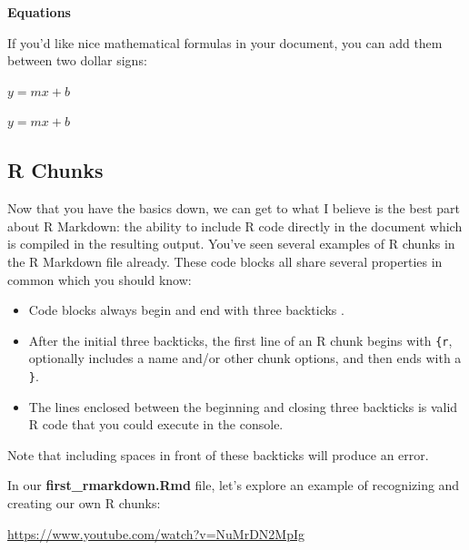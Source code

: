 \documentclass[]{tufte-book}
\newenvironment{Shaded}{\begin{snugshade}}{\end{snugshade}}
\newcommand{\NormalTok}[1]{#1}
\providecommand{\tightlist}{%
  \setlength{\itemsep}{0pt}\setlength{\parskip}{0pt}}
\begin{document}
\vspace*{0.2in}

\noindent\textbf{Equations}\vspace*{0.1in}

If you'd like nice mathematical formulas in your document, you can add them between two dollar signs:

\begin{Shaded}
\begin{Highlighting}[]
\NormalTok{$y = mx + b$}
\end{Highlighting}
\end{Shaded}

\(y = mx + b\)

\subsection{R Chunks}\label{r-chunks}

Now that you have the basics down, we can get to what I believe is the best part about R Markdown: the ability to include R code directly in the document which is compiled in the resulting output. You've seen several examples of R chunks in the R Markdown file already. These code blocks all share several properties in common which you should know:

\begin{itemize}
\tightlist
\item
  Code blocks always begin and end with three backticks \texttt{\textasciigrave{}\textasciigrave{}\textasciigrave{}}.
\item
  After the initial three backticks, the first line of an R chunk begins with \texttt{\{r}, optionally includes a name and/or other chunk options, and then ends with a \texttt{\}}.
\item
  The lines enclosed between the beginning and closing three backticks is valid R code that you could execute in the console.
\end{itemize}

Note that including spaces in front of these backticks will produce an error.

In our \textbf{first\_rmarkdown.Rmd} file, let's explore an example of recognizing and creating our own R chunks:

\vspace{0.1in}\begin{center}\footnotesize{\url{https://www.youtube.com/watch?v=NuMrDN2MpIg}}\end{center}\vspace{0.1in}
\end{document}
